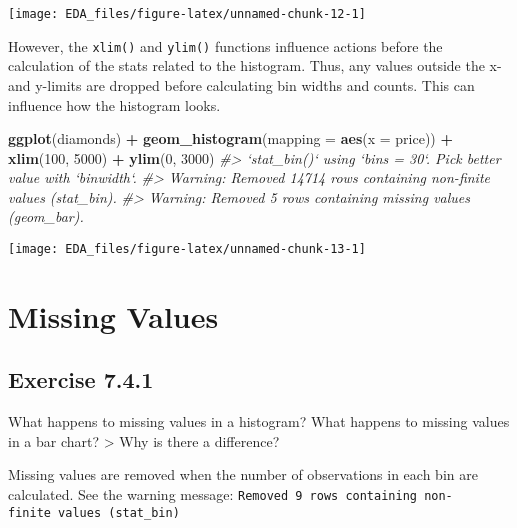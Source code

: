 \documentclass[]{book}
\newenvironment{Shaded}{\begin{snugshade}}{\end{snugshade}}
\newcommand{\CommentTok}[1]{\textcolor[rgb]{0.56,0.35,0.01}{\textit{#1}}}
\newcommand{\DataTypeTok}[1]{\textcolor[rgb]{0.13,0.29,0.53}{#1}}
\newcommand{\DecValTok}[1]{\textcolor[rgb]{0.00,0.00,0.81}{#1}}
\newcommand{\KeywordTok}[1]{\textcolor[rgb]{0.13,0.29,0.53}{\textbf{#1}}}
\newcommand{\NormalTok}[1]{#1}
\newcommand{\OperatorTok}[1]{\textcolor[rgb]{0.81,0.36,0.00}{\textbf{#1}}}
\newcommand{\StringTok}[1]{\textcolor[rgb]{0.31,0.60,0.02}{#1}}
\theoremstyle{plain}
\theoremstyle{remark}
\theoremstyle{definition}
\theoremstyle{definition}
\theoremstyle{definition}
\theoremstyle{remark}
\begin{document}
\begin{center}\texttt{[image: EDA\_files/figure-latex/unnamed-chunk-12-1]} \end{center}

However, the \texttt{xlim()} and \texttt{ylim()} functions influence
actions before the calculation of the stats related to the histogram.
Thus, any values outside the x- and y-limits are dropped before
calculating bin widths and counts. This can influence how the histogram
looks.

\begin{Shaded}
\begin{Highlighting}[]
\KeywordTok{ggplot}\NormalTok{(diamonds) }\OperatorTok{+}
\StringTok{  }\KeywordTok{geom_histogram}\NormalTok{(}\DataTypeTok{mapping =} \KeywordTok{aes}\NormalTok{(}\DataTypeTok{x =}\NormalTok{ price)) }\OperatorTok{+}
\StringTok{  }\KeywordTok{xlim}\NormalTok{(}\DecValTok{100}\NormalTok{, }\DecValTok{5000}\NormalTok{) }\OperatorTok{+}
\StringTok{  }\KeywordTok{ylim}\NormalTok{(}\DecValTok{0}\NormalTok{, }\DecValTok{3000}\NormalTok{)}
\CommentTok{#> `stat_bin()` using `bins = 30`. Pick better value with `binwidth`.}
\CommentTok{#> Warning: Removed 14714 rows containing non-finite values (stat_bin).}
\CommentTok{#> Warning: Removed 5 rows containing missing values (geom_bar).}
\end{Highlighting}
\end{Shaded}

\begin{center}\texttt{[image: EDA\_files/figure-latex/unnamed-chunk-13-1]} \end{center}

\hypertarget{missing-values}{%
\section{Missing Values}\label{missing-values}}

\hypertarget{exercise-7.4.1}{%
\subsection*{\texorpdfstring{Exercise
{7.4.1}}{Exercise 7.4.1}}\label{exercise-7.4.1}}

What happens to missing values in a histogram? What happens to missing
values in a bar chart? \textgreater{} Why is there a difference?

Missing values are removed when the number of observations in each bin
are calculated. See the warning message:
\texttt{Removed\ 9\ rows\ containing\ non-finite\ values\ (stat\_bin)}
\end{document}
